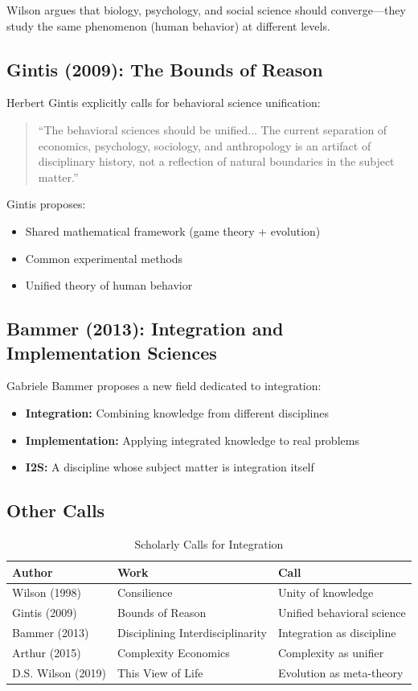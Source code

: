 Wilson argues that biology, psychology, and social science should converge—they study the same phenomenon (human behavior) at different levels.

\subsection{Gintis (2009): The Bounds of Reason}

Herbert Gintis explicitly calls for behavioral science unification:
\begin{quote}
``The behavioral sciences should be unified... The current separation of economics, psychology, sociology, and anthropology is an artifact of disciplinary history, not a reflection of natural boundaries in the subject matter.''
\end{quote}

Gintis proposes:
\begin{itemize}
\item Shared mathematical framework (game theory + evolution)
\item Common experimental methods
\item Unified theory of human behavior
\end{itemize}

\subsection{Bammer (2013): Integration and Implementation Sciences}

Gabriele Bammer proposes a new field dedicated to integration:
\begin{itemize}
\item \textbf{Integration:} Combining knowledge from different disciplines
\item \textbf{Implementation:} Applying integrated knowledge to real problems
\item \textbf{I2S:} A discipline whose subject matter is integration itself
\end{itemize}

\subsection{Other Calls}

\begin{table}[htbp]
\centering
\caption{Scholarly Calls for Integration}
\label{tab:calls}
\renewcommand{\arraystretch}{1.3}
\begin{tabular}{@{}lll@{}}
\toprule
\textbf{Author} & \textbf{Work} & \textbf{Call} \\
\midrule
Wilson (1998) & Consilience & Unity of knowledge \\
Gintis (2009) & Bounds of Reason & Unified behavioral science \\
Bammer (2013) & Disciplining Interdisciplinarity & Integration as discipline \\
Arthur (2015) & Complexity Economics & Complexity as unifier \\
D.S. Wilson (2019) & This View of Life & Evolution as meta-theory \\
\bottomrule
\end{tabular}
\end{table}


